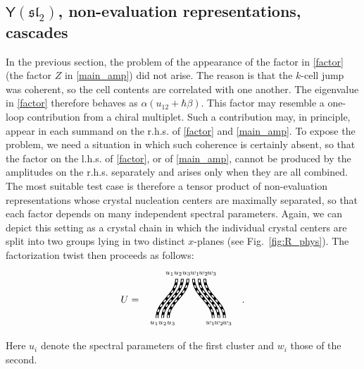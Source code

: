 \documentclass[10pt]{article}
\theoremstyle{definition}
\def\fl{\mathfrak{l}}
\def\fs{\mathfrak{s}}
\def\fs{\mathfrak{s}}
\def\myY{{\mathsf{Y}}}
\numberwithin{equation}{section}
\begin{document}
\subsection{\texorpdfstring{$\myY(\fs\fl_{2})$}{}, non-evaluation representations, cascades} \label{sec:sl(2)_nonev}

In the previous section, the problem of the appearance of the factor in \eqref{factor} (the factor $Z$ in \eqref{main_amp}) did not arise.
The reason is that the $k$-cell jump was coherent, so the cell contents are correlated with one another.
The eigenvalue in \eqref{factor} therefore behaves as $\alpha(u_{12}+\hbar\beta)$.
This factor may resemble a one-loop contribution from a chiral multiplet.
Such a contribution may, in principle, appear in each summand on the r.h.s. of \eqref{factor} and \eqref{main_amp}.
To expose the problem, we need a situation in which such coherence is certainly absent, so that the factor on the l.h.s. of \eqref{factor}, or of \eqref{main_amp}, cannot be produced by the amplitudes on the r.h.s. separately and arises only when they are all combined.
The most suitable test case is therefore a tensor product of non-evaluation representations whose crystal nucleation centers are maximally separated, so that each factor depends on many independent spectral parameters.
Again, we can depict this setting as a crystal chain in which the individual crystal centers are split into two groups lying in two distinct $x$-planes (see Fig.~\ref{fig:R_phys}).
The factorization twist then proceeds as follows:
\begin{equation}\label{U_cab}
	U=\begin{array}{c}
		\begin{tikzpicture}[yscale=0.7]
			\draw[line width=1mm] (-1.2,-1) to[out=90,in=270] (-0.5,1) (-1,-1) to[out=90,in=270] (-0.3,1) (-0.8,-1) to[out=90,in=270] (-0.1,1) (0.8,-1) to[out=90,in=270] (0.1,1) (1,-1) to[out=90,in=270] (0.3,1) (1.2,-1) to[out=90,in=270] (0.5,1);
			\draw[white, dashed, line width=0.5mm] (-1.2,-1) to[out=90,in=270] (-0.5,1) (-1,-1) to[out=90,in=270] (-0.3,1) (-0.8,-1) to[out=90,in=270] (-0.1,1) (0.8,-1) to[out=90,in=270] (0.1,1) (1,-1) to[out=90,in=270] (0.3,1) (1.2,-1) to[out=90,in=270] (0.5,1);
			\node[below] at (-1.3,-1) {$\scriptstyle u_1$};
			\node[below] at (-1,-1) {$\scriptstyle u_2$};
			\node[below] at (-0.7,-1) {$\scriptstyle u_3$};
			\node[below] at (0.7,-1) {$\scriptstyle w_1$};
			\node[below] at (1,-1) {$\scriptstyle w_2$};
			\node[below] at (1.3,-1) {$\scriptstyle w_3$};
			\node[above] at (-0.75,1) {$\scriptstyle u_1$};
			\node[above] at (-0.45,1) {$\scriptstyle u_2$};
			\node[above] at (-0.15,1) {$\scriptstyle u_3$};
			\node[above] at (0.15,1) {$\scriptstyle w_1$};
			\node[above] at (0.45,1) {$\scriptstyle w_2$};
			\node[above] at (0.75,1) {$\scriptstyle w_3$};
		\end{tikzpicture}
	\end{array}\,.
\end{equation}
Here $u_i$ denote the spectral parameters of the first cluster and $w_i$ those of the second.
\end{document}
